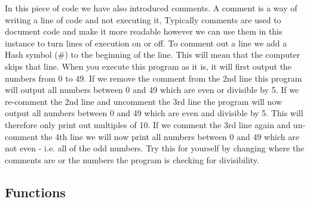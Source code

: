 \documentclass[twocolumn]{article}
\begin{document}
In this piece of code we have also introduced comments. A comment is a way of writing a line of code and not executing it, Typically comments are used to document code and make it more readable however we can use them in this instance to turn lines of execution on or off. To comment out a line we add a Hash symbol (\#) to the beginning of the line. This will mean that the computer skips that line. When you execute this program as it is, it will first output the numbers from 0 to 49. If we remove the comment from the 2nd line this program will output all numbers between 0 and 49 which are even or divisible by 5. If we re-comment the 2nd line and uncomment the 3rd line the program will now output all numbers between 0 and 49 which are even and divisible by 5. This will therefore only print out multiples of 10. If we comment the 3rd line again and un-comment the 4th line we will now print all numbers between 0 and 49 which are not even - i.e. all of the odd numbers. Try this for yourself by changing where the comments are or the numbers the program is checking for divisibility.

\subsection{Functions}
\end{document}
